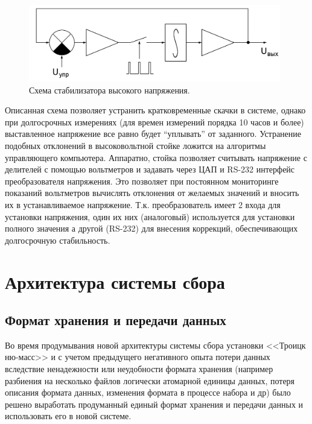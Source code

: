 \documentclass[a4paper,14pt]{extreport}
\begin{document}
\begin{figure}
  \centering
  \includegraphics[width = 0.98\textwidth]{img/nu_mass_setup/hv_stabilizer_scheme.png}
    \caption{Схема стабилизатора высокого напряжения.}
    \label{fig:numass-hv-stabilizer-scheme}
\end{figure}

Описанная схема позволяет устранить кратковременные скачки в системе, однако при долгосрочных измерениях (для времен измерений порядка 10 часов и более) выставленное напряжение все равно будет “уплывать” от заданного. Устранение подобных отклонений в высоковольтной стойке ложится на алгоритмы управляющего компьютера. Аппаратно, стойка позволяет считывать напряжение с делителей с помощью вольтметров и задавать через ЦАП и  RS-232 интерфейс преобразователя напряжения. Это позволяет при постоянном мониторинге показаний вольтметров вычислять отклонения от желаемых значений и вносить их в устанавливаемое напряжение. Т.к. преобразователь имеет 2 входа для установки напряжения, один их них (аналоговый) используется для установки полного значения а другой (RS-232) для внесения коррекций, обеспечивающих долгосрочную стабильность.


\chapter{Архитектура системы сбора}

\section{Формат хранения и передачи данных}

Во время продумывания новой архитектуры системы сбора установки <<Троицк ню-масс>> и с учетом предыдущего негативного опыта потери данных вследствие ненадежности или неудобности формата хранения (например разбиения на несколько файлов логически атомарной единицы данных, потеря описания формата данных, изменения формата в процессе набора и др) было решено выработать продуманный единый формат хранения и передачи данных и использовать его в новой системе.
\end{document}
